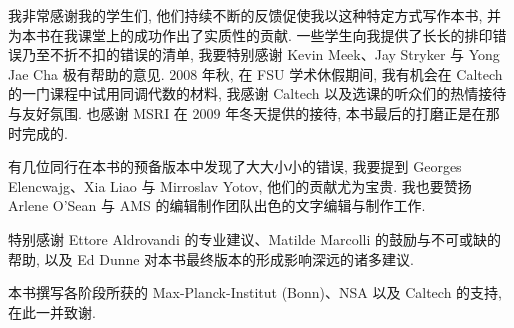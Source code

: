 我非常感谢我的学生们, 他们持续不断的反馈促使我以这种特定方式写作本书, 并为本书在我课堂上的成功作出了实质性的贡献. 一些学生向我提供了长长的排印错误乃至不折不扣的错误的清单, 我要特别感谢 Kevin Meek、Jay Stryker 与 Yong Jae Cha 极有帮助的意见. $2008$ 年秋, 在 FSU 学术休假期间, 我有机会在 Caltech 的一门课程中试用同调代数的材料, 我感谢 Caltech 以及选课的听众们的热情接待与友好氛围. 也感谢 MSRI 在 $2009$ 年冬天提供的接待, 本书最后的打磨正是在那时完成的.

有几位同行在本书的预备版本中发现了大大小小的错误, 我要提到 Georges Elencwajg、Xia Liao 与 Mirroslav Yotov, 他们的贡献尤为宝贵. 我也要赞扬 Arlene O'Sean 与 AMS 的编辑制作团队出色的文字编辑与制作工作.

特别感谢 Ettore Aldrovandi 的专业建议、Matilde Marcolli 的鼓励与不可或缺的帮助, 以及 Ed Dunne 对本书最终版本的形成影响深远的诸多建议.

本书撰写各阶段所获的 Max-Planck-Institut (Bonn)、NSA 以及 Caltech 的支持, 在此一并致谢.
